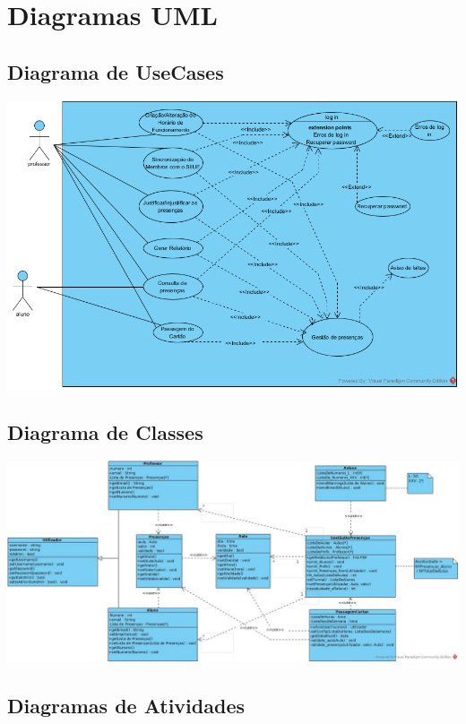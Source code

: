 \documentclass[11pt]{article}   %
\begin{document}
\newpage

\section{Diagramas UML}

\subsection{Diagrama de UseCases}
    \includegraphics[width=\textwidth]{images/diagra_usecases.png}

\subsection{Diagrama de Classes}
    \includegraphics[width=\textwidth]{images/diagrama_classes.png}

\subsection{Diagramas de Atividades}
\end{document}
